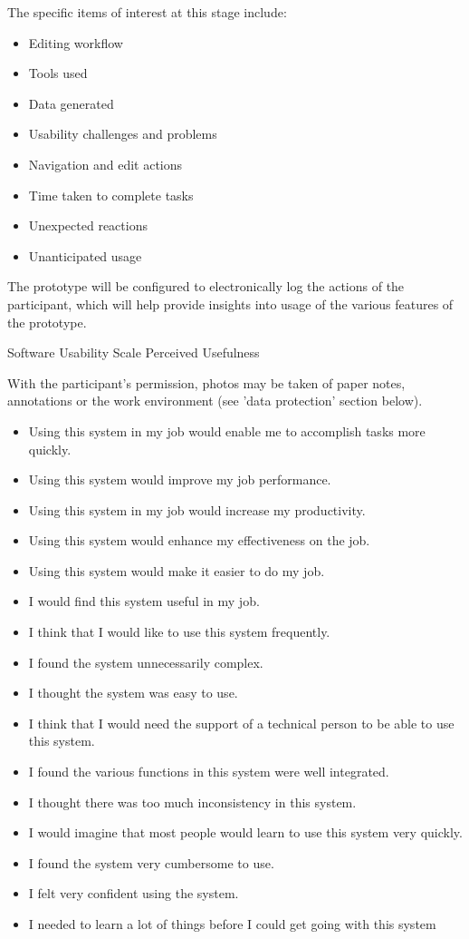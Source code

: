 The specific items of interest at this stage include:
\begin{itemize}
\item Editing workflow
\item Tools used
\item Data generated
\item Usability challenges and problems
\item Navigation and edit actions
\item Time taken to complete tasks
\item Unexpected reactions
\item Unanticipated usage
\end{itemize}

The prototype will be configured to electronically log the actions of the participant, which will help provide insights
into usage of the various features of the prototype.

Software Usability Scale \citep{Brooke1996}
Perceived Usefulness \citep{Davis1989}

With the participant's permission, photos may be taken of paper notes, annotations or the work environment (see 'data
protection' section below).
{\singlespacing \begin{itemize} \item Using this system in my job would enable me to accomplish tasks more quickly.
  \item Using this system would improve my job performance.
  \item Using this system in my job would increase my productivity.
  \item Using this system would enhance my effectiveness on the job.
  \item Using this system would make it easier to do my job.
\end{itemize}
}

{\singlespacing
\begin{itemize}
  \item I would find this system useful in my job.
  \item I think that I would like to use this system frequently.
  \item I found the system unnecessarily complex.
  \item I thought the system was easy to use.
  \item I think that I would need the support of a technical person to be able to use this system.
  \item I found the various functions in this system were well integrated.
  \item I thought there was too much inconsistency in this system.
  \item I would imagine that most people would learn to use this system very quickly.
  \item I found the system very cumbersome to use.
  \item I felt very confident using the system.
  \item I needed to learn a lot of things before I could get going with this system
\end{itemize}
}

